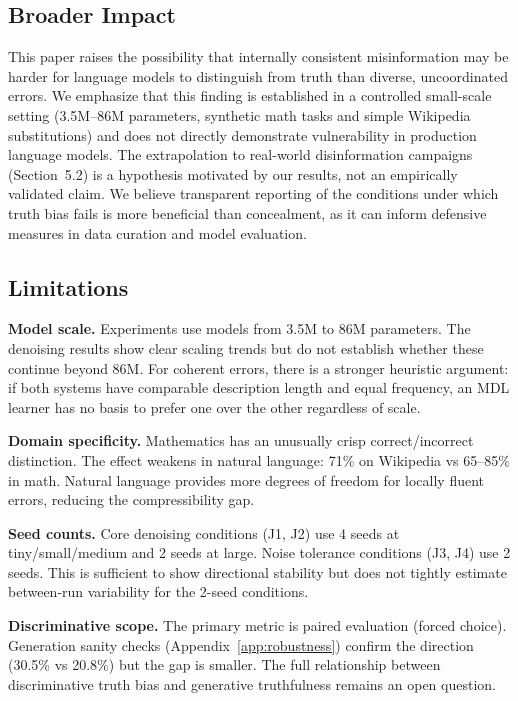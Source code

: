 \documentclass[10pt]{article} %
\begin{document}
\subsection{Broader Impact}

This paper raises the possibility that internally consistent misinformation may be harder for language models to distinguish from truth than diverse, uncoordinated errors. We emphasize that this finding is established in a controlled small-scale setting (3.5M--86M parameters, synthetic math tasks and simple Wikipedia substitutions) and does not directly demonstrate vulnerability in production language models. The extrapolation to real-world disinformation campaigns (Section~5.2) is a hypothesis motivated by our results, not an empirically validated claim. We believe transparent reporting of the conditions under which truth bias fails is more beneficial than concealment, as it can inform defensive measures in data curation and model evaluation.

\subsection{Limitations}

\textbf{Model scale.} Experiments use models from 3.5M to 86M parameters. The denoising results show clear scaling trends but do not establish whether these continue beyond 86M. For coherent errors, there is a stronger heuristic argument: if both systems have comparable description length and equal frequency, an MDL learner has no basis to prefer one over the other regardless of scale.

\textbf{Domain specificity.} Mathematics has an unusually crisp correct/incorrect distinction. The effect weakens in natural language: 71\% on Wikipedia vs 65--85\% in math. Natural language provides more degrees of freedom for locally fluent errors, reducing the compressibility gap.

\textbf{Seed counts.} Core denoising conditions (J1, J2) use 4 seeds at tiny/small/medium and 2 seeds at large. Noise tolerance conditions (J3, J4) use 2 seeds. This is sufficient to show directional stability but does not tightly estimate between-run variability for the 2-seed conditions.

\textbf{Discriminative scope.} The primary metric is paired evaluation (forced choice). Generation sanity checks (Appendix~\ref{app:robustness}) confirm the direction (30.5\% vs 20.8\%) but the gap is smaller. The full relationship between discriminative truth bias and generative truthfulness remains an open question.
\end{document}

